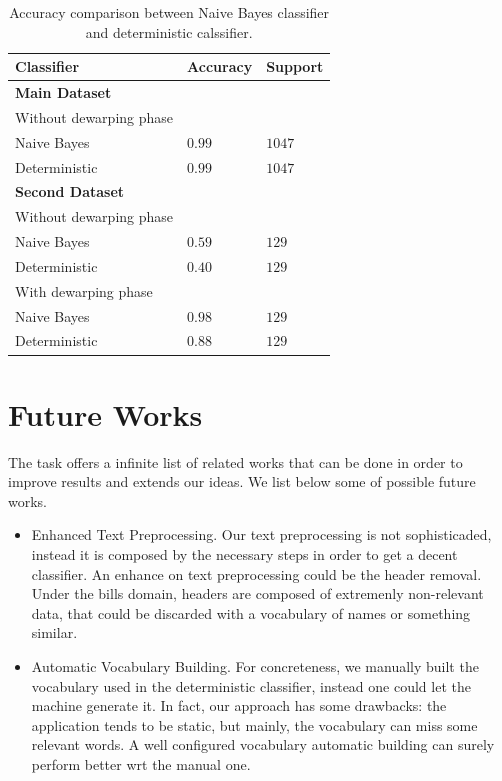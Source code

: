 \documentclass[10pt,twocolumn,letterpaper]{article}
\begin{document}
\begin{table}[!h]
  \begin{center}
    \begin{tabular}{lll}
      \hline
      Classifier & Accuracy & Support \\ \hline
      \textbf{Main Dataset} \\
      \small Without dewarping phase\\
      \; \; Naive Bayes & $0.99$ & $1047$ \\
      \; \; Deterministic & $0.99$ & $1047$ \\ \hline
      
      \textbf{Second Dataset} & & \\
      \small Without dewarping phase \\
      \; \; Naive Bayes & $0.59$ & $129$ \\
      \; \; Deterministic & $0.40$ & $129$ \\ 
      
      \small With dewarping phase \\
      \; \; Naive Bayes & $0.98$ & $129$ \\
      \; \; Deterministic & $0.88$ & $129$ \\ \hline
    \end{tabular}
  \end{center}
  \label{table:classifiers-comparison}
  \caption{Accuracy comparison between Naive Bayes classifier and
    deterministic calssifier.}
\end{table}

\section{Future Works}
\label{sec:future-works}

The task offers a infinite list of related works that can be done in
order to improve results and extends our ideas. We list below some of
possible future works.

\begin{itemize}
  \item Enhanced Text Preprocessing. Our text preprocessing is not
    sophisticaded, instead it is composed by the necessary steps in
    order to get a decent classifier. An enhance on text preprocessing
    could be the header removal. Under the bills domain, headers are
    composed of extremenly non-relevant data, that could be discarded
    with a vocabulary of names or something similar.
  \item Automatic Vocabulary Building. For concreteness, we manually
    built the vocabulary used in the deterministic classifier, instead
    one could let the machine generate it. In fact, our approach has
    some drawbacks: the application tends to be static, but mainly,
    the vocabulary can miss some relevant words. A well configured
    vocabulary automatic building can surely perform better wrt the
    manual one.
\end{itemize}
\end{document}
